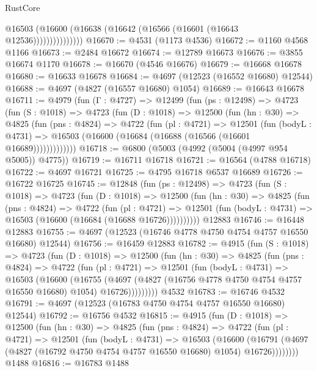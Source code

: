 \begin{lexlean}{RustCore}
\begin{coremodule}
                    @16503 (@16600 (@16638 (@16642 (@16566 (@16601 (@16643 @12536)))))))))))))))
@16670 := @4531 (@1173 @4536)
@16672 := @1160 @4568 @1166
@16673 := @2484 @16672
@16674 := @12789 @16673
@16676 := @3855 @16674 @1170
@16678 := @16670 (@4546 @16676)
@16679 := @16668 @16678
@16680 := @16633 @16678
@16684 := @4697 (@12523 (@16552 @16680) @12544)
@16688 := @4697 (@4827 (@16557 @16680) @1054)
@16689 := @16643 @16678
@16711 := @4979
    (fun (Γ : @4727) =>
    @12499
      (fun (ps : @12498) =>
      @4723
        (fun (S : @1018) =>
        @4723
          (fun (D : @1018) =>
          @12500
            (fun (hn : @30) =>
            @4825
              (fun (pns : @4824) =>
              @4722
                (fun (pl : @4721) =>
                @12501
                  (fun (bodyL : @4731) =>
                  @16503 (@16600 (@16684 (@16688 (@16566 (@16601 @16689)))))))))))))
@16718 := @6800 (@5003 (@4992 (@5004 (@4997 @954 @5005)) @4775))
@16719 := @16711 @16718
@16721 := @16564 (@4788 @16718)
@16722 := @4697 @16721
@16725 := @4795 @16718 @6537 @16689
@16726 := @16722 @16725
@16745 := @12848
    (fun (ps : @12498) =>
    @4723
      (fun (S : @1018) =>
      @4723
        (fun (D : @1018) =>
        @12500
          (fun (hn : @30) =>
          @4825
            (fun (pns : @4824) =>
            @4722
              (fun (pl : @4721) =>
              @12501 (fun (bodyL : @4731) => @16503 (@16600 (@16684 (@16688 @16726))))))))))
    @12883
@16746 := @16448 @12883
@16755 := @4697 (@12523 (@16746 @4778 @4750 @4754 @4757 @16550 @16680) @12544)
@16756 := @16459 @12883
@16782 := @4915
    (fun (S : @1018) =>
    @4723
      (fun (D : @1018) =>
      @12500
        (fun (hn : @30) =>
        @4825
          (fun (pns : @4824) =>
          @4722
            (fun (pl : @4721) =>
            @12501
              (fun (bodyL : @4731) =>
              @16503
                (@16600
                  (@16755
                    (@4697
                      (@4827 (@16756 @4778 @4750 @4754 @4757 @16550 @16680) @1054)
                      @16726)))))))))
    @4532
@16783 := @16746 @4532
@16791 := @4697 (@12523 (@16783 @4750 @4754 @4757 @16550 @16680) @12544)
@16792 := @16756 @4532
@16815 := @4915
    (fun (D : @1018) =>
    @12500
      (fun (hn : @30) =>
      @4825
        (fun (pns : @4824) =>
        @4722
          (fun (pl : @4721) =>
          @12501
            (fun (bodyL : @4731) =>
            @16503
              (@16600
                (@16791 (@4697 (@4827 (@16792 @4750 @4754 @4757 @16550 @16680) @1054) @16726))))))))
    @1488
@16816 := @16783 @1488

\end{coremodule}
\end{lexlean}
